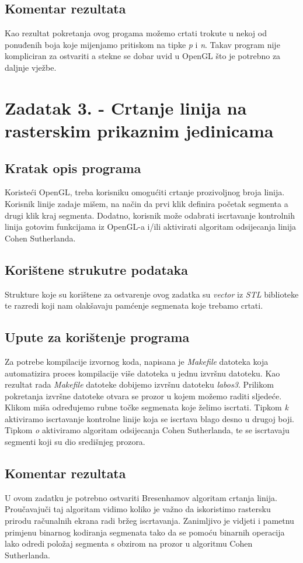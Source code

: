 \documentclass{report}
\begin{document}
\subsection{Komentar rezultata}
Kao rezultat pokretanja ovog progama možemo crtati trokute u nekoj od ponuđenih boja koje mijenjamo pritiskom na tipke \textit{p} i \textit{n}. Takav program nije kompliciran za ostvariti a stekne se dobar uvid u OpenGL što je potrebno za daljnje vježbe.

\section{Zadatak 3. - Crtanje linija na rasterskim prikaznim jedinicama}
\subsection{Kratak opis programa}
Koristeći OpenGL, treba korisniku omogućiti crtanje prozivoljnog broja linija. Korisnik linije zadaje mišem, na način da prvi klik definira početak segmenta a drugi klik kraj segmenta. Dodatno, korisnik može odabrati iscrtavanje kontrolnih linija gotovim funkcijama iz OpenGL-a i/ili aktivirati algoritam odsijecanja linija Cohen Sutherlanda.

\subsection{Korištene strukutre podataka}
Strukture koje su korištene za ostvarenje ovog zadatka su \textit{vector} iz \textit{STL} biblioteke te razredi koji nam olakšavaju pamćenje segmenata koje trebamo crtati.

\subsection{Upute za korištenje programa}
Za potrebe kompilacije izvornog koda, napisana je \textit{Makefile} datoteka koja automatizira proces kompilacije više datoteka u jednu izvršnu datoteku. Kao rezultat rada \textit{Makefile} datoteke dobijemo izvršnu datoteku \textit{labos3}. Prilikom pokretanja izvršne datoteke otvara se prozor u kojem možemo raditi sljedeće. Klikom miša određujemo rubne točke segmenata koje želimo iscrtati. Tipkom \textit{k} aktiviramo iscrtavanje kontrolne linije koja se iscrtava blago desno u drugoj boji. Tipkom \textit{o} aktiviramo algoritam odsijecanja Cohen Sutherlanda, te se iscrtavaju segmenti koji su dio središnjeg prozora.

\subsection{Komentar rezultata}
U ovom zadatku je potrebno ostvariti Bresenhamov algoritam crtanja linija. Proučavajuči taj algoritam vidimo koliko je važno da iskoristimo rastersku prirodu računalnih ekrana radi bržeg iscrtavanja. Zanimljivo je vidjeti i pametnu primjenu binarnog kodiranja segmenata tako da se pomoću binarnih operacija lako odredi položaj segmenta s obzirom na prozor u algoritmu Cohen Sutherlanda. 
\end{document}
